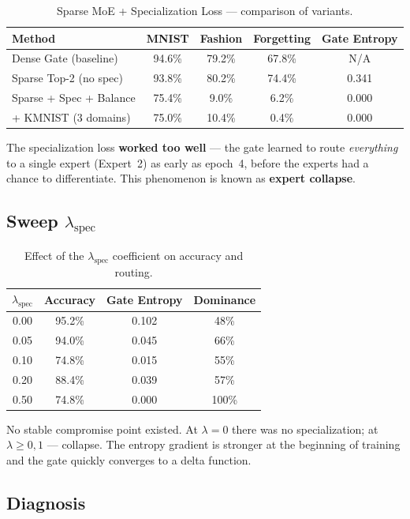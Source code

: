 \documentclass[11pt,a4paper]{report}
\begin{document}
\begin{table}[h]
\centering
\caption{Sparse MoE + Specialization Loss --- comparison of variants.}
\begin{tabular}{l c c c c}
\hline
\textbf{Method} & \textbf{MNIST} & \textbf{Fashion} & \textbf{Forgetting} & \textbf{Gate Entropy} \\
\hline
Dense Gate (baseline) & 94.6\% & 79.2\% & 67.8\% & N/A \\
Sparse Top-2 (no spec) & 93.8\% & 80.2\% & 74.4\% & 0.341 \\
Sparse + Spec + Balance & 75.4\% & 9.0\% & 6.2\% & 0.000 \\
+ KMNIST (3 domains) & 75.0\% & 10.4\% & 0.4\% & 0.000 \\
\hline
\end{tabular}
\end{table}

The specialization loss \textbf{worked too well} --- the gate learned to route \emph{everything} to a single expert (Expert~2) as early as epoch~4, before the experts had a chance to differentiate. This phenomenon is known as \textbf{expert collapse}.

\subsection{Sweep $\lambda_\text{spec}$}

\begin{table}[h]
\centering
\caption{Effect of the $\lambda_\text{spec}$ coefficient on accuracy and routing.}
\begin{tabular}{c c c c}
\hline
$\lambda_\text{spec}$ & \textbf{Accuracy} & \textbf{Gate Entropy} & \textbf{Dominance} \\
\hline
0.00 & 95.2\% & 0.102 & 48\% \\
0.05 & 94.0\% & 0.045 & 66\% \\
0.10 & 74.8\% & 0.015 & 55\% \\
0.20 & 88.4\% & 0.039 & 57\% \\
0.50 & 74.8\% & 0.000 & 100\% \\
\hline
\end{tabular}
\end{table}

No stable compromise point existed. At $\lambda = 0$ there was no specialization; at $\lambda \geq 0{,}1$ --- collapse. The entropy gradient is stronger at the beginning of training and the gate quickly converges to a delta function.

\subsection{Diagnosis}
\end{document}
